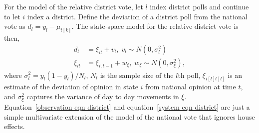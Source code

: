 \documentclass[12pt,final,fleqn]{article}
\theoremstyle{plain}
\begin{document}
For the model of the relative district vote, let $l$ index district polls and continue to let $i$ index a district. Define the deviation of a district poll from the national vote as $d_l = y_l - \mu_{t[k]}$. The state-space model for the relative district vote is then,
\begin{align}
\label{observation eqn district}
d_l &= \xi_{it} + v_l, \; v_l\sim N(0, \sigma^2_l)\\ 
\label{system eqn district}
\xi_{it} &= \xi_{i,t-1} + w_\xi, \; w_\xi \sim N(0, \sigma^2_{\xi}), 
\end{align}
where $\sigma^2_l = y_l(1-y_l)/N_l$, $N_l$ is the sample size of the $l$th poll, $\xi_{i[l]t[l]}$ is an estimate of the deviation of opinion in state $i$ from national opinion at time $t$, and $\sigma^2_{\xi}$ captures the variance of day to day movements in $\xi$. Equation~\ref{observation eqn district} and equation~\ref{system eqn district} are just a simple multivariate extension of the model of the national vote that ignores house effects.
\end{document}
